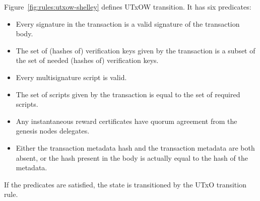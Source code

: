 Figure~\ref{fig:rules:utxow-shelley} defines UTxOW transition.
It has six predicates:
\begin{itemize}
  \item Every signature in the transaction is a valid signature of the transaction body.
  \item The set of (hashes of) verification keys given by the transaction is a subset of
    the set of needed (hashes of) verification keys.
  \item Every multisignature script is valid.
  \item The set of scripts given by the transaction is equal to the set of required scripts.
  \item Any instantaneous reward certificates have quorum agreement from the genesis nodes delegates.
  \item Either the transaction metadata hash and the transaction metadata are both absent,
    or the hash present in the body is actually equal to the hash of the metadata.
\end{itemize}
If the predicates are satisfied, the state is transitioned by the UTxO transition rule.

